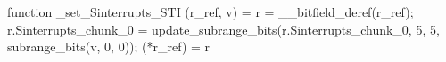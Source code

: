 function _set_Sinterrupts_STI (r_ref, v) = {
    r = __bitfield_deref(r_ref);
    r.Sinterrupts_chunk_0 = update_subrange_bits(r.Sinterrupts_chunk_0, 5, 5, subrange_bits(v, 0, 0));
    (*r_ref) = r
}
